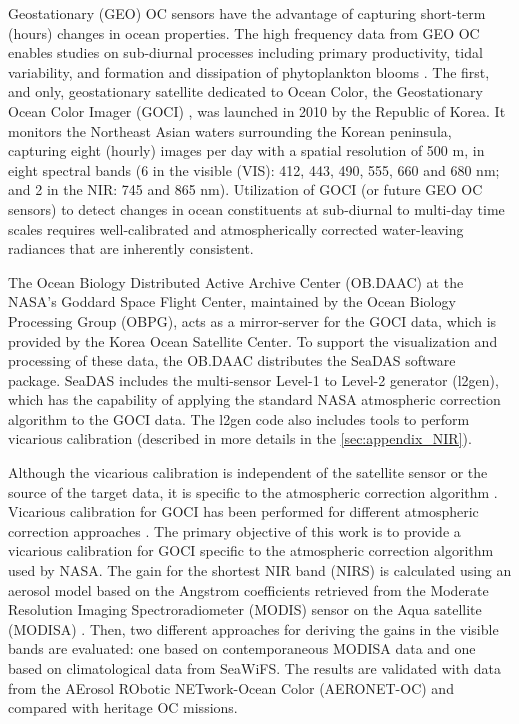\documentclass[10pt]{article}
\begin{document}
Geostationary (GEO) OC sensors have the advantage of capturing short-term (hours) changes in ocean properties. The high frequency data from GEO OC enables studies on sub-diurnal processes including primary productivity, tidal variability, and formation and dissipation of phytoplankton blooms \cite{Ruddick2014}. The first, and only, geostationary satellite dedicated to Ocean Color, the Geostationary Ocean Color Imager (GOCI) \cite{Ryu2012}, was launched in 2010 by the Republic of Korea. It monitors the Northeast Asian waters surrounding the Korean peninsula, capturing eight (hourly) images per day with a spatial resolution of 500 m, in eight spectral bands (6 in the visible (VIS): 412, 443, 490, 555, 660 and 680 nm; and 2 in the NIR: 745 and 865 nm).  Utilization of GOCI (or future GEO OC sensors) to detect changes in ocean constituents at sub-diurnal to multi-day time scales requires well-calibrated and atmospherically corrected water-leaving radiances that are inherently consistent. 

The Ocean Biology Distributed Active Archive Center (OB.DAAC) at the NASA's Goddard Space Flight Center, maintained by the Ocean Biology Processing Group (OBPG), acts as a mirror-server for the GOCI data, which is provided by the Korea Ocean Satellite Center.  To support the visualization and processing of these data, the OB.DAAC distributes the SeaDAS software package.  SeaDAS includes the multi-sensor Level-1 to Level-2 generator (l2gen), which has the capability of applying the standard NASA atmospheric correction algorithm to the GOCI data. The l2gen code also includes tools to perform vicarious calibration (described in more details in the \autoref{sec:appendix_NIR}). 

Although the vicarious calibration is independent of the satellite sensor or the source of the target data, it is specific to the atmospheric correction algorithm \cite{Franz:07}. Vicarious calibration for GOCI has been performed for different atmospheric correction approaches \cite{Ahn2015,Wang:13}. The primary objective of this work is to provide a vicarious calibration for GOCI specific to the atmospheric correction algorithm used by NASA. The gain for the shortest NIR band (NIRS) is calculated using an aerosol model based on the Angstrom coefficients retrieved from the Moderate Resolution Imaging Spectroradiometer (MODIS) sensor on the Aqua satellite (MODISA) \cite{Esaias1998}. Then, two different approaches for deriving the gains in the visible bands are evaluated: one based on contemporaneous MODISA data and one based on climatological data from SeaWiFS. The results are validated with data from the AErosol RObotic NETwork-Ocean Color (AERONET-OC) \cite{Zibordi2009} and compared with heritage OC missions. 
\end{document}
